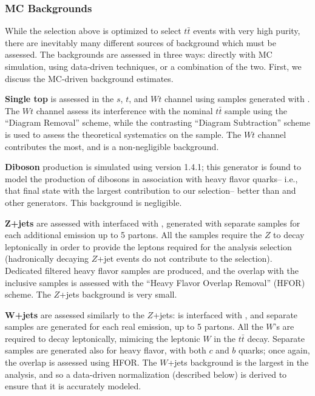 	\subsubsection{MC Backgrounds}

While the selection above is optimized to select $t\bar{t}$ events with very high purity, there are inevitably many different sources of background which must be assessed. The backgrounds are assessed in three ways: directly with MC simulation, using data-driven techniques, or a combination of the two. First, we discuss the MC-driven background estimates.

\textbf{Single top} is assessed in the $s$, $t$, and $Wt$ channel using samples generated with \PowPythia. The $Wt$ channel assess its interference with the nominal $t\bar{t}$ sample using the ``Diagram Removal'' scheme, while the contrasting ``Diagram Subtraction'' scheme is used to assess the theoretical systematics on the sample. The $Wt$ channel contributes the most, and is a non-negligible background.

\textbf{Diboson} production is simulated using \Sherpa version 1.4.1; this generator is found to model the production of dibosons in association with heavy flavor quarks-- i.e., that final state with the largest contribution to our selection-- better than \Herwigpp and other generators. This background is negligible.

\textbf{$\mathbf{Z}$+jets} are assessed with \Alpgen interfaced with \Pythia, generated with separate samples for each additional emission up to 5 partons. All the samples require the $Z$ to decay leptonically in order to provide the leptons required for the analysis selection (hadronically decaying $Z$+jet events do not contribute to the selection). Dedicated filtered heavy flavor samples are produced, and the overlap with the inclusive samples is assessed with the ``Heavy Flavor Overlap Removal'' (HFOR) scheme. The $Z$+jets background is very small.

\textbf{$\mathbf{W}$+jets} are assessed similarly to the $Z$+jets: \Alpgen is interfaced with \Pythia, and separate samples are generated for each real emission, up to 5 partons. All the $W$'s are required to decay leptonically, mimicing the leptonic $W$ in the $t\bar{t}$ decay. Separate samples are generated also for heavy flavor, with both $c$ and $b$ quarks; once again, the overlap is assessed using HFOR. The $W$+jets background is the largest in the analysis, and so a data-driven normalization (described below) is derived to ensure that it is accurately modeled. 


